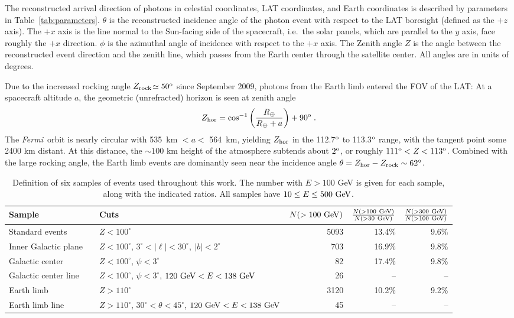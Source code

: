 \documentclass[aps,twocolumn,prd,superscriptaddress,showpacs,nofootinbib,fixfloat]{revtex4}
\newcommand{\be}{\begin{equation}}
\newcommand{\ee}{\end{equation}}
\newcommand{\Fermi}{{\slshape Fermi}}
\newcommand{\GeV}{{\rm ~GeV}}
\newcommand{\degree}{^{\rm o}}
\newcommand{\zrock}{$Z_{\rm rock}$}
\begin{document}
The reconstructed arrival direction of photons in celestial coordinates, LAT
coordinates, and Earth coordinates is described by parameters in 
Table~\ref{tab:parameters}.  $\theta$ is the reconstructed incidence angle of
the photon event with respect to the LAT boresight (defined as the $+z$ axis).
The $+x$ axis is the line normal to the Sun-facing side of the spacecraft,
i.e.~the solar panels, which are parallel to the $y$ axis, face roughly the $+x$ direction.   $\phi$ is the
azimuthal angle of incidence with respect to the $+x$ axis.
The Zenith angle $Z$ is the angle between the
reconstructed event direction and the zenith line, which passes from the
Earth center through the satellite center.  All angles are in units of
degrees.

Due to the increased rocking angle \zrock$\simeq50\degree$
since September 2009, photons from the Earth limb 
entered the FOV of the LAT:
%
At a spacecraft altitude $a$, the geometric (unrefracted) horizon is seen at zenith angle \be
Z_{\rm hor} = \cos^{-1}\left(\frac{R_\oplus}{R_\oplus+a}\right)+90\degree\;. \ee
The \Fermi\ orbit is nearly circular with 535~km $< a <$ 564~km, yielding
$Z_{\rm hor}$ in the 112.7$\degree$ to 113.3$\degree$ range, with the tangent
point some 2400 km distant.  At this distance, the $\sim 100$ km height of the
atmosphere subtends about $2\degree$, or roughly $111\degree < Z <
113\degree$. Combined with the large rocking angle, the Earth limb events are
dominantly seen near the incidence angle $\theta=Z_{\rm hor}-Z_{\rm rock}\sim 62^\circ$.
\medskip

\begin{table}
  \begin{tabular}{lllrrr}
    \hline
    Sample &&Cuts & $N(>100\GeV)$ & $\frac{N(>100\GeV)}{N(>30\GeV)}$ & $\frac{N(>300\GeV)}{N(>100\GeV)}$\\
    \hline
    Standard events      &  & $Z<100^\circ$ & 5093 & 13.4\% & 9.6\% \\
    Inner Galactic plane &  & $Z<100^\circ$, $3^\circ < |\ell| < 30^\circ,\ |b|<2^\circ$     & 703 & 16.9\% & 9.8\% \\
    Galactic center      &  & $Z<100^\circ$, $\psi<3^\circ$ & 82 & 17.4\% & 9.8\% \\
    Galactic center line &  & $Z<100^\circ$, $\psi<3^\circ$, $120\GeV<E<138\GeV$             & 26 & -- & -- \\
    Earth limb           &  & $Z>110^\circ$ & 3120 & 10.2\% & 9.2\% \\
    Earth limb line      &  & $Z>110^\circ$, $30^\circ<\theta<45^\circ$, $120\GeV<E<138\GeV$ & 45 & -- & -- \\ 
    \hline
  \end{tabular}
  \caption{Definition of six samples of events used throughout this work.  The
    number with $E>100$ GeV is given for each sample, along with the indicated
    ratios.  All samples have $10\leq E\leq500\GeV$.}
  \label{tab:regions}
\end{table}
\end{document}
